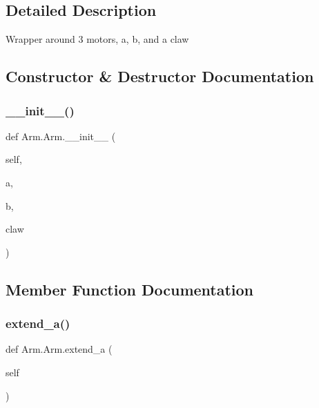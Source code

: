 \subsection{Detailed Description}
\begin{DoxyVerb}Wrapper around 3 motors, a, b, and a claw
\end{DoxyVerb}
 

\subsection{Constructor \& Destructor Documentation}
\mbox{\label{class_arm_1_1_arm_aa824d8a53e7d3eefe3318654d318290e}} 
\subsubsection{\texorpdfstring{\+\_\+\+\_\+init\+\_\+\+\_\+()}{\_\_init\_\_()}}
{\footnotesize\ttfamily def Arm.\+Arm.\+\_\+\+\_\+init\+\_\+\+\_\+ (\begin{DoxyParamCaption}\item[{}]{self,  }\item[{}]{a,  }\item[{}]{b,  }\item[{}]{claw }\end{DoxyParamCaption})}



\subsection{Member Function Documentation}
\mbox{\label{class_arm_1_1_arm_a8044b0ae39c9d1557263e2bc7e8a6458}} 
\subsubsection{\texorpdfstring{extend\+\_\+a()}{extend\_a()}}
{\footnotesize\ttfamily def Arm.\+Arm.\+extend\+\_\+a (\begin{DoxyParamCaption}\item[{}]{self }\end{DoxyParamCaption})}

